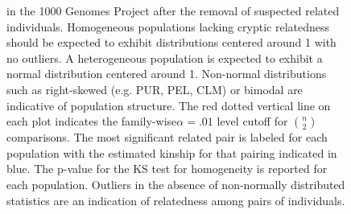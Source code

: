 \begin{figure}
{in the 1000 Genomes Project after the removal of suspected related
individuals. Homogeneous populations lacking cryptic relatedness should
be expected to exhibit distributions centered around 1 with no outliers.
A heterogeneous population is expected to exhibit a normal distribution
centered around 1. Non-normal distributions such as right-skewed (e.g.
PUR, PEL, CLM) or bimodal are indicative of population structure.
The red dotted vertical line on each plot indicates the family-wise$\alpha=.01$
level cutoff for ${n \choose 2}$ comparisons. The most significant
related pair is labeled for each population with the estimated kinship
for that pairing indicated in blue. The p-value for the KS test for
homogeneity is reported for each population. Outliers in the absence
of non-normally distributed statistics are an indication of relatedness
among pairs of individuals.}
\label{All s plots-1}
\end{figure}

